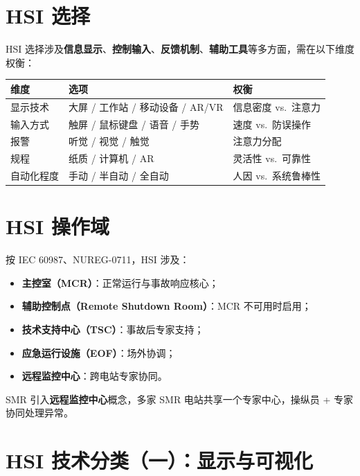 \documentclass[
  UTF8,
  scheme=plain,
  fontsize=10pt,
  openany
]{ctexbook}
\begin{document}
\section{HSI 选择}\label{hsi-ux9009ux62e9}

HSI
选择涉及\textbf{信息显示}、\textbf{控制输入}、\textbf{反馈机制}、\textbf{辅助工具}等多方面，需在以下维度权衡：

{\def\LTcaptype{none} %
\begin{longtable}[]{@{}lll@{}}
\toprule\noalign{}
维度 & 选项 & 权衡 \\
\midrule\noalign{}
\endhead
\bottomrule\noalign{}
\endlastfoot
显示技术 & 大屏 / 工作站 / 移动设备 / AR/VR & 信息密度 vs.~注意力 \\
输入方式 & 触屏 / 鼠标键盘 / 语音 / 手势 & 速度 vs.~防误操作 \\
报警 & 听觉 / 视觉 / 触觉 & 注意力分配 \\
规程 & 纸质 / 计算机 / AR & 灵活性 vs.~可靠性 \\
自动化程度 & 手动 / 半自动 / 全自动 & 人因 vs.~系统鲁棒性 \\
\end{longtable}
}

\section{HSI 操作域}\label{hsi-ux64cdux4f5cux57df}

按 IEC 60987、NUREG-0711，HSI 涉及：

\begin{itemize}
\tightlist
\item
  \textbf{主控室（MCR）}：正常运行与事故响应核心；
\item
  \textbf{辅助控制点（Remote Shutdown Room）}：MCR 不可用时启用；
\item
  \textbf{技术支持中心（TSC）}：事故后专家支持；
\item
  \textbf{应急运行设施（EOF）}：场外协调；
\item
  \textbf{远程监控中心}：跨电站专家协同。
\end{itemize}

SMR 引入\textbf{远程监控中心}概念，多家 SMR 电站共享一个专家中心，操纵员
+ 专家协同处理异常。

\section{HSI
技术分类（一）：显示与可视化}\label{hsi-ux6280ux672fux5206ux7c7bux4e00ux663eux793aux4e0eux53efux89c6ux5316}
\end{document}
